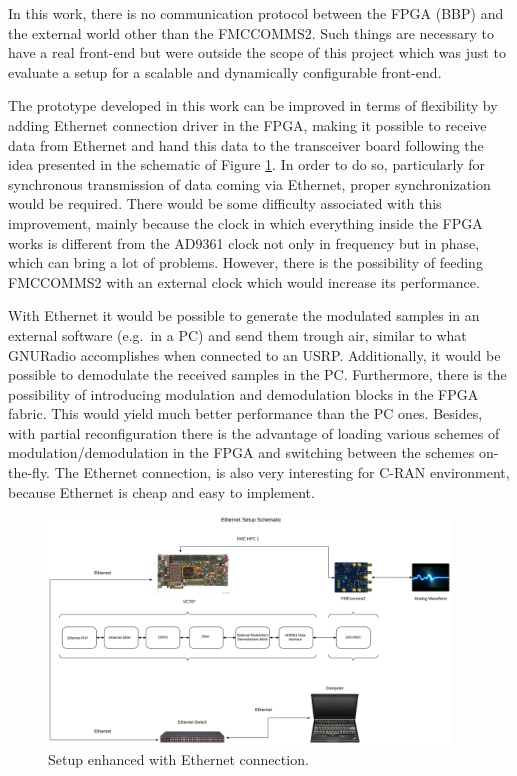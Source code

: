 In this work, there is no communication protocol between the FPGA (BBP) and the
external world other than the FMCCOMMS2. Such things are necessary to have a real
front-end but were outside the scope of this project which was just to evaluate a
setup for a scalable and dynamically configurable front-end.

The prototype developed in this work can be improved in terms of flexibility by
adding Ethernet connection driver in the FPGA, making it possible to receive
data from Ethernet and hand this data to the transceiver board following the
idea presented in the schematic of Figure \ref{fig:setupeth}. In order to do so,
particularly for synchronous transmission of data coming via Ethernet, proper
synchronization would be required. There would be some difficulty associated
with this improvement, mainly because the clock in which everything inside the
FPGA works is different from the AD9361 clock not only in frequency but in
phase, which can bring a lot of problems. However, there is the possibility of
feeding FMCCOMMS2 with an external clock which would increase its performance.

With Ethernet it would be possible to generate the modulated samples in an
external software (e.g.\ in a PC) and send them trough air, similar to what
GNURadio accomplishes when connected to an USRP. Additionally, it would be
possible to demodulate the received samples in the PC. Furthermore, there is the
possibility of introducing modulation and demodulation blocks in the FPGA
fabric. This would yield much better performance than the PC ones. Besides, with
partial reconfiguration there is the advantage of loading various schemes of
modulation/demodulation in the FPGA and switching between the schemes
on-the-fly. The Ethernet connection, is also very interesting for C-RAN
environment, because Ethernet is cheap and easy to implement.

\begin{figure}[htbp]
    \centering
    \includegraphics[width=0.95\textwidth]{./figures/eth_setup}
    \caption{ Setup enhanced with Ethernet connection.
    \label{fig:setupeth}}
\end{figure}
